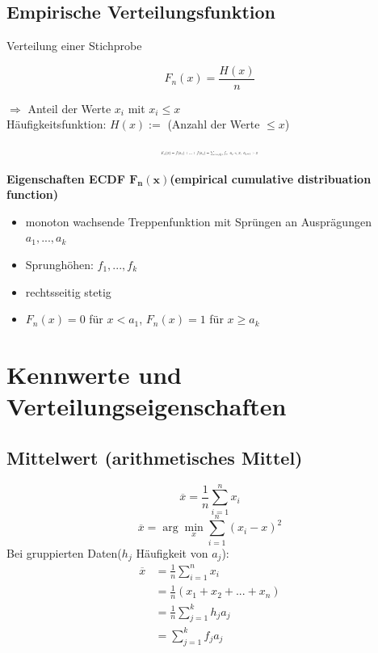 \documentclass[10pt,a4paper,landscape]{article}
\begin{document}
\begin{multicols}{4}
\subsection{Empirische Verteilungsfunktion}
Verteilung einer Stichprobe

\[
F_n(x)=\frac{H(x)}{n}
\]
\begin{center}
$\Rightarrow$ Anteil der Werte $x_i$ mit $x_i \leqslant x$\\
Häufigkeitsfunktion: $H(x) :=$ (Anzahl der Werte $\leqslant x$)
\end{center}

\[ \resizebox{0.25\textwidth}{!}{$
F_n(x)=f(a_1)+...+f(a_j)=\sum_{i:a_i \leqslant x} f_i, ~a_j\leqslant x, ~a_{j+1}>x 
$}
\]

\textbf{Eigenschaften ECDF $\mathbf{F_n(x)}$(empirical cumulative distribuation function)}
\begin{itemize}
\item monoton wachsende Treppenfunktion mit Sprüngen an Ausprägungen $a_1, ..., a_k$
\item Sprunghöhen: $f_1, ..., f_k$
\item rechtsseitig stetig
\item $F_n(x)=0$ für $x<a_1$, $F_n(x)=1$ für $x\geqslant a_k$
\end{itemize}


\section{Kennwerte und Verteilungseigenschaften}

\subsection{Mittelwert (arithmetisches Mittel)}
\[
\overline{x}=\frac{1}{n}\sum_{i=1}^n x_i
\]
\[
\overline{x}=\arg \min_x \sum_{i=1}^n(x_i-x)^2
\]
Bei gruppierten Daten($h_j$ Häufigkeit von $a_j$):
\begin{align*}
\overline{x} &= \frac{1}{n}\sum_{i=1}^n x_i \\
			&= \frac{1}{n}(x_1 + x_2 + ... + x_n) \\
			&= \frac{1}{n}\sum_{j=1}^kh_ja_j \\
			&= \sum_{j=1}^kf_ja_j
\end{align*}


\end{multicols}
\end{document}
